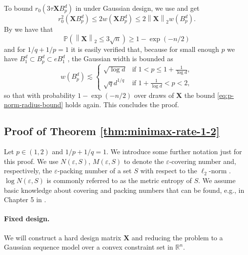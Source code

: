 \documentclass[a4paper]{article}
\newcommand{\pr}[1]{\left(#1\right)}
\newcommand{\norm}[1]{\left\|#1\right\|}
\newcommand{\X}[0]{\mathbf{X}}
\newcommand{\RR}[0]{\mathbb{R}}
\newcommand{\PP}[0]{\mathbb{P}}
\newcommand{\eps}[0]{\varepsilon}
\newcommand{\rzero}[0]{r_{0}}
\theoremstyle{thmstyle}
\theoremstyle{defstyle}
\theoremstyle{remark}
\begin{document}
    To bound $\rzero(3\tau \X B_p^d)$ in under Gaussian design, we use \cite[Exercise 7.5.4]{Vershynin2018} and get
    \begin{equation*}
        \rzero^2(\X B_p^d)\leq 2 w(\X B_p^d)\leq 2\norm{\X}_2 w(B_p^d).
    \end{equation*}
    By \cite[Theorem 6.1]{Wainwright2019} we have that
    \begin{equation*}
        \PP\pr{\norm{\X}_2 \leq 3\sqrt{n} } \geq 1-\exp\pr{-n/2}
    \end{equation*}
    and for $1/q+1/p=1$ it is easily verified that, because for small enough $p$ we have $B_1^d\subset B_p^d \subset eB_1^d$ \citep{Lecue2017regularization,Vershynin2018},  the Gaussian width is bounded as
    \begin{equation*}
        w(B_p^d) \lesssim 
        \begin{cases}
            \sqrt{\log d} & \text{if } 1<p\leq 1+\frac{1}{\log d}, \\
            \sqrt{q}d^{1/q} & \text{if } 1+\frac{1}{\log d}< p <2,
        \end{cases}
    \end{equation*}
    so that with probability $1-\exp(-n/2)$ over draws of $\X$ the bound \cref{eq:p-norm-radius-bound} holds again. 
    This concludes the proof.

\subsection{Proof of Theorem \ref{thm:minimax-rate-1-2}}
\label{subsec:proof-minimax-rate-1-2}

Let $p\in(1,2)$ and $1/p+1/q=1$.  We introduce some further notation just for this proof.
We use $N(\eps,S)$, $M(\eps,S)$ to denote the $\eps$-covering number and, respectively, the $\eps$-packing number of a set $S$ with respect to the $\ell_2$-norm \citep[Definitions 5.1 and 5.4]{Wainwright2019}. $\log N(\eps,S)$ is commonly referred to as the metric entropy of $S$. We assume basic knowledge about covering and packing numbers that can be found, e.g., in Chapter 5 in \cite{Wainwright2019}.

\paragraph{Fixed design.} We will construct a hard design matrix $\X$ and reducing the problem to a Gaussian sequence model over a convex constraint set in $\RR^n$.
\end{document}
